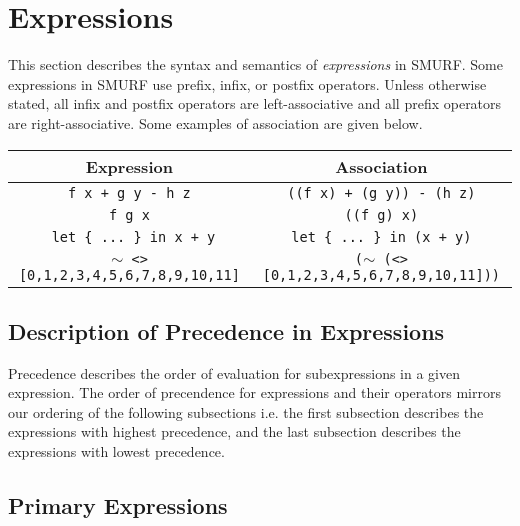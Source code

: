 \section{Expressions}

This section describes the syntax and semantics of \emph{expressions} in 
SMURF. Some expressions in SMURF use prefix, infix, or postfix operators.
Unless otherwise stated, all infix and postfix operators are left-associative and
all prefix operators are right-associative. Some examples of association are given below.


\begin{center}
	\begin{tabular}{|c|c|}
		\hline
		Expression & Association \\
		\hline
		\texttt{f x + g y - h z} & \texttt{((f x) + (g y)) - (h z)} \\
		\texttt{f g x} & \texttt{((f g) x)} \\
		\texttt{ let \{ ... \} in x + y} & \texttt{let \{ ... \} in (x + y)} \\
		\texttt{$\sim$ <> [0,1,2,3,4,5,6,7,8,9,10,11]} &
					\texttt{($\sim$ (<> [0,1,2,3,4,5,6,7,8,9,10,11]))}\\
		\hline
	\end{tabular}
\end{center}

%
%
%

\subsection{Description of Precedence in Expressions}
Precedence describes the order of evaluation for subexpressions in a given expression.
The order of precendence for expressions and their operators mirrors our ordering of the following
subsections i.e. the first subsection describes the expressions with highest precedence, and the last
subsection describes the expressions with lowest precedence.

\subsection{Primary Expressions}

